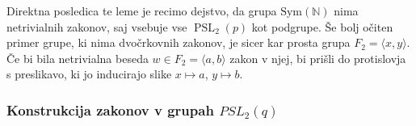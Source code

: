     Direktna posledica te leme je recimo dejstvo, da grupa $\text{Sym}(\mathbb{N})$ nima netrivialnih zakonov, saj vsebuje vse $\operatorname{PSL}_2(p)$ kot podgrupe.
    Še bolj očiten primer grupe, ki nima dvočrkovnih zakonov, je sicer kar prosta grupa $F_2 = \langle x , y \rangle$. Če bi bila netrivialna beseda $w \in F_2 = \langle a , b \rangle$ zakon v njej,
    bi prišli do protislovja s preslikavo, ki jo inducirajo slike $x \mapsto a$, $y \mapsto b$.
    

    \subsubsection{Konstrukcija zakonov v grupah $PSL_2(q)$}

